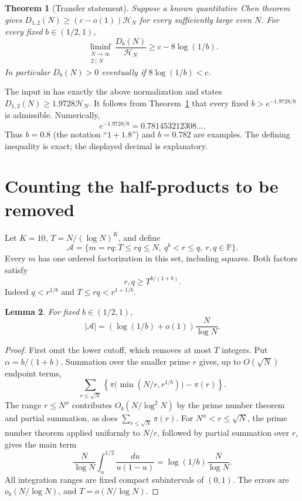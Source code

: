 \documentclass[11pt]{article}
\newtheorem{theorem}{Theorem}
\newtheorem{lemma}[theorem]{Lemma}
\newcommand{\PP}{\mathbb P}
\newcommand{\HN}{\mathcal H_N}
\begin{document}
\begin{theorem}[Transfer statement]\label{thm:transfer}
Suppose a known quantitative Chen theorem gives
$D_{1,2}(N)\ge(c-o(1))\HN$ for every sufficiently large even $N$.
For every fixed $b\in(1/2,1)$,
\[
 \liminf_{\substack{N\to\infty\\2\mid N}}\frac{D_b(N)}{\HN}
 \ge c-8\log(1/b).
\]
In particular $D_b(N)>0$ eventually if $8\log(1/b)<c$.
\end{theorem}

The input in \cite[Theorem 1.1]{Li2026} has exactly the above normalization
and states $D_{1,2}(N)\ge1.9728\HN$. It follows from
Theorem~\ref{thm:transfer} that
every fixed $b>e^{-1.9728/8}$ is admissible. Numerically,
\[
 e^{-1.9728/8}=0.781453212308\ldots .
\]
Thus $b=0.8$ (the notation ``$1+1.8$'') and $b=0.782$ are examples.
The defining inequality is exact; the displayed decimal is explanatory.

\section{Counting the half-products to be removed}
Let $K=10$, $T=N/(\log N)^K$, and define
\[
 \mathcal A=\{m=rq:T\le rq\le N,\ q^b<r\le q,\ r,q\in\PP\}.
\]
Every $m$ has one ordered factorization in this set, including squares.
Both factors satisfy
\begin{equation}\label{eq:rough}
 r,q\ge T^{b/(1+b)}.
\end{equation}
Indeed $q<r^{1/b}$ and $T\le rq<r^{1+1/b}$.

\begin{lemma}\label{lem:mass}
For fixed $b\in(1/2,1)$,
\[
 |\mathcal A|=\left(\log(1/b)+o(1)\right)\frac{N}{\log N}.
\]
\end{lemma}
\begin{proof}
First omit the lower cutoff, which removes at most $T$ integers. Put
$\alpha=b/(1+b)$. Summation over the smaller prime $r$ gives, up to
$O(\sqrt N)$ endpoint terms,
\[
 \sum_{r\le\sqrt N}
 \left\{\pi\bigl(\min(N/r,r^{1/b})\bigr)-\pi(r)\right\}.
\]
The range $r\le N^\alpha$ contributes $O_b(N/\log^2N)$ by the prime
number theorem and partial summation, as does $\sum_{r\le\sqrt N}\pi(r)$.
For $N^\alpha<r\le\sqrt N$, the prime number theorem applied uniformly
to $N/r$, followed by partial summation over $r$, gives the main term
\[
 \frac{N}{\log N}\int_{\alpha}^{1/2}\frac{du}{u(1-u)}
 =\log(1/b)\frac{N}{\log N}.
\]
All integration ranges are fixed compact subintervals of $(0,1)$.
The errors are $o_b(N/\log N)$, and $T=o(N/\log N)$.
\end{proof}
\end{document}
